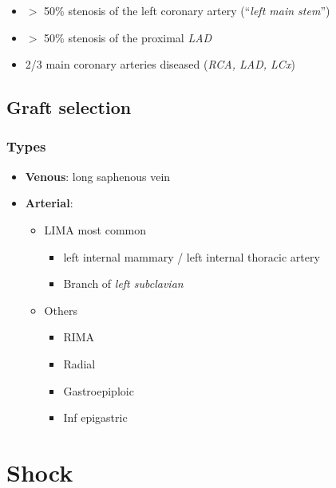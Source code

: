 \documentclass[
  14pt,
]{memoir}
\providecommand{\tightlist}{%
  \setlength{\itemsep}{0pt}\setlength{\parskip}{0pt}}
\begin{document}
\begin{itemize}
\tightlist
\item
  \(>\) 50\% stenosis of the left coronary artery (``\emph{left main
  stem}'')
\item
  \(>\) 50\% stenosis of the proximal \emph{LAD}
\item
  2/3 main coronary arteries diseased (\emph{RCA, LAD, LCx})
\end{itemize}

\hypertarget{graft-selection}{%
\section{Graft selection}\label{graft-selection}}

\hypertarget{types}{%
\subsection{Types}\label{types}}

\begin{itemize}
\tightlist
\item
  \textbf{Venous}: long saphenous vein
\item
  \textbf{Arterial}:

  \begin{itemize}
  \tightlist
  \item
    LIMA most common

    \begin{itemize}
    \tightlist
    \item
      left internal mammary / left internal thoracic artery
    \item
      Branch of \emph{left subclavian}
    \end{itemize}
  \item
    Others

    \begin{itemize}
    \tightlist
    \item
      RIMA
    \item
      Radial
    \item
      Gastroepiploic
    \item
      Inf epigastric
    \end{itemize}
  \end{itemize}
\end{itemize}

\pagebreak

\hypertarget{shock}{%
\chapter{Shock}\label{shock}}
\end{document}
